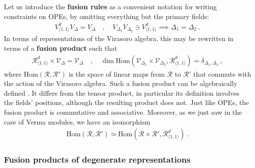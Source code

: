 \documentclass[12pt, a4paper]{article}
\theoremstyle{break}
\begin{document}
Let us introduce the \textbf{fusion rules} as a convenient notation for writing constraints on OPEs, by omitting everything but the primary fields:
\begin{align}
 V^d_{\langle 1,1\rangle} V_{\Delta} = V_\Delta \quad , \quad V_{\Delta_1} V_{\Delta_2} \ni V^d_{\langle 1,1\rangle} \implies \Delta_1=\Delta_2\ . 
\end{align}
In terms of representations of the Virasoro algebra, this may be rewritten in terms of a \textbf{fusion product} such that 
\begin{align}
 \mathcal{R}^d_{\langle 1,1\rangle} \times \mathcal{V}_\Delta = \mathcal{V}_\Delta \quad , \quad \dim\text{Hom}\left(\mathcal{V}_{\Delta_1}\times \mathcal{V}_{\Delta_2}, \mathcal{R}^d_{\langle 1,1\rangle}\right) = \delta_{\Delta_1,\Delta_2}\ ,
 \label{rtv}
\end{align}
where $\text{Hom}(\mathcal{R},\mathcal{R}')$ is the space of linear maps from $\mathcal{R}$ to $\mathcal{R}'$ that commute with the action of the Virasoro algebra. 
Such a fusion product can be algebraically defined \cite{gab99}. It differs from the tensor product, in particular its definition involves the fields' positions, although the resulting product does not. Just like OPEs, the fusion product is commutative and associative. Moreover, as we just saw in the case of Verma modules, we have an isomorphism
\begin{align}
 \text{Hom}\left(\mathcal{R},\mathcal{R}'\right) \simeq \text{Hom}\left(\mathcal{R}\times\mathcal{R}',\mathcal{R}^d_{\langle 1,1\rangle}\right)\ . 
 \label{hrr}
\end{align}

\subsubsection{Fusion products of degenerate representations}
\end{document}

